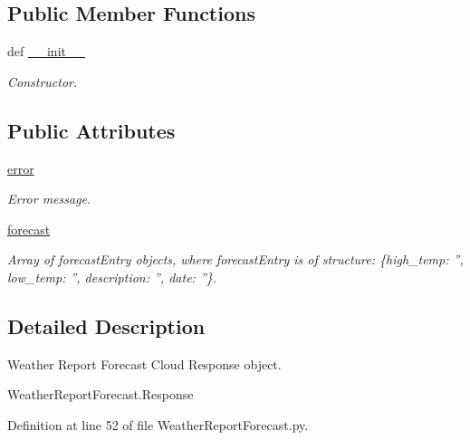 \subsection*{Public Member Functions}
\begin{DoxyCompactItemize}
\item 
def \hyperlink{classRappCloud_1_1CloudMsgs_1_1WeatherReportForecast_1_1WeatherReportForecast_1_1Response_a3e6292e2b8c7e974f30d622d9d6b7a88}{\-\_\-\-\_\-init\-\_\-\-\_\-}
\begin{DoxyCompactList}\small\item\em Constructor. \end{DoxyCompactList}\end{DoxyCompactItemize}
\subsection*{Public Attributes}
\begin{DoxyCompactItemize}
\item 
\hyperlink{classRappCloud_1_1CloudMsgs_1_1WeatherReportForecast_1_1WeatherReportForecast_1_1Response_a2fb190f0c571acb9c4f476a4b38e9510}{error}
\begin{DoxyCompactList}\small\item\em Error message. \end{DoxyCompactList}\item 
\hyperlink{classRappCloud_1_1CloudMsgs_1_1WeatherReportForecast_1_1WeatherReportForecast_1_1Response_a1ed6be7665ffe0bfefa11be6d62ff789}{forecast}
\begin{DoxyCompactList}\small\item\em Array of forecast\-Entry objects, where forecast\-Entry is of structure\-: \{high\-\_\-temp\-: '', low\-\_\-temp\-: '', description\-: '', date\-: ''\}. \end{DoxyCompactList}\end{DoxyCompactItemize}


\subsection{Detailed Description}
\begin{DoxyVerb}Weather Report Forecast Cloud Response object.

WeatherReportForecast.Response
\end{DoxyVerb}
 

Definition at line 52 of file Weather\-Report\-Forecast.\-py.



